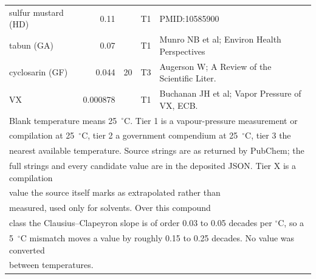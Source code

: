 \begin{tabular}{lrccl}
sulfur mustard (HD) & 0.11 &  & T1 & PMID:10585900 \\
tabun (GA) & 0.07 &  & T1 & Munro NB et al; Environ Health Perspectives \\
cyclosarin (GF) & 0.044 & 20 & T3 & Augerson W; A Review of the Scientific Liter. \\
VX & 0.000878 &  & T1 & Buchanan JH et al; Vapor Pressure of VX, ECB. \\
\hline
\multicolumn{5}{l}{\footnotesize Blank temperature means 25~$^{\circ}$C. Tier 1 is a vapour-pressure measurement or}\\
\multicolumn{5}{l}{\footnotesize compilation at 25~$^{\circ}$C, tier 2 a government compendium at 25~$^{\circ}$C, tier 3 the}\\
\multicolumn{5}{l}{\footnotesize nearest available temperature. Source strings are as returned by PubChem; the}\\
\multicolumn{5}{l}{\footnotesize full strings and every candidate value are in the deposited JSON. Tier X is a compilation}\\
\multicolumn{5}{l}{\footnotesize value the source itself marks as extrapolated rather than}\\
\multicolumn{5}{l}{\footnotesize measured, used only for solvents. Over this compound}\\
\multicolumn{5}{l}{\footnotesize class the Clausius--Clapeyron slope is of order 0.03 to 0.05 decades per $^{\circ}$C, so a}\\
\multicolumn{5}{l}{\footnotesize 5~$^{\circ}$C mismatch moves a value by roughly 0.15 to 0.25 decades. No value was converted}\\
\multicolumn{5}{l}{\footnotesize between temperatures.}\\
\end{tabular}
